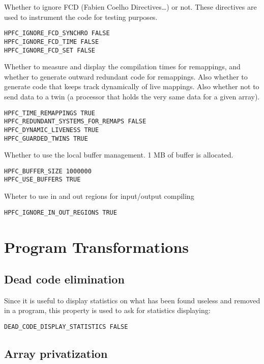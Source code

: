 Whether to ignore FCD (Fabien Coelho Directives\ldots) or not. These
directives are used to instrument the code for testing purposes.

\begin{verbatim}
HPFC_IGNORE_FCD_SYNCHRO FALSE
HPFC_IGNORE_FCD_TIME FALSE
HPFC_IGNORE_FCD_SET FALSE
\end{verbatim}

Whether to measure and display the compilation times for remappings,
and whether to generate outward redundant code for remappings. Also
whether to generate code that keeps track dynamically of live mappings. 
Also whether not to send data to a twin (a processor that holds the very
same data for a given array). 

\begin{verbatim}
HPFC_TIME_REMAPPINGS TRUE
HPFC_REDUNDANT_SYSTEMS_FOR_REMAPS FALSE
HPFC_DYNAMIC_LIVENESS TRUE
HPFC_GUARDED_TWINS TRUE
\end{verbatim}

Whether to use the local buffer management. 1 MB of buffer is allocated.

\begin{verbatim}
HPFC_BUFFER_SIZE 1000000
HPFC_USE_BUFFERS TRUE
\end{verbatim}

Wheter to use in and out regions for input/output compiling

\begin{verbatim}
HPFC_IGNORE_IN_OUT_REGIONS TRUE
\end{verbatim}

\section{Program Transformations}


\subsection{Dead code elimination}

Since it is useful to display statistics on what has been found
useless and removed in a program, this property is used to ask for
statistics displaying:
\begin{verbatim}
DEAD_CODE_DISPLAY_STATISTICS FALSE
\end{verbatim}


\subsection{Array privatization}

